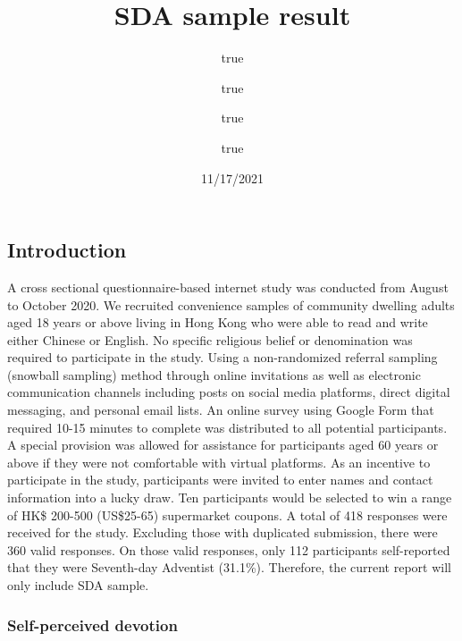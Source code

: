 \documentclass[
]{article}
\title{SDA sample result}
\author{true \and true \and true \and true}
\date{11/17/2021}
\begin{document}
\maketitle

{
\setcounter{tocdepth}{2}
\tableofcontents
}
\hypertarget{introduction}{%
\subsection{Introduction}\label{introduction}}

A cross sectional questionnaire-based internet study was conducted from August to October 2020. We recruited convenience samples of community dwelling adults aged 18 years or above living in Hong Kong who were able to read and write either Chinese or English. No specific religious belief or denomination was required to participate in the study. Using a non-randomized referral sampling (snowball sampling) method through online invitations as well as electronic communication channels including posts on social media platforms, direct digital messaging, and personal email lists. An online survey using Google Form that required 10-15 minutes to complete was distributed to all potential participants. A special provision was allowed for assistance for participants aged 60 years or above if they were not comfortable with virtual platforms. As an incentive to participate in the study, participants were invited to enter names and contact information into a lucky draw. Ten participants would be selected to win a range of HK\$ 200-500 (US\$25-65) supermarket coupons. A total of 418 responses were received for the study. Excluding those with duplicated submission, there were 360 valid responses. On those valid responses, only 112 participants self-reported that they were Seventh-day Adventist (31.1\%). Therefore, the current report will only include SDA sample.

\hypertarget{self-perceived-devotion}{%
\subsubsection{Self-perceived devotion}\label{self-perceived-devotion}}

\providecommand{\docline}[3]{\noalign{\global\setlength{\arrayrulewidth}{#1}}\arrayrulecolor[HTML]{#2}\cline{#3}}

\setlength{\tabcolsep}{2pt}

\renewcommand*{\arraystretch}{1.5}
\end{document}

